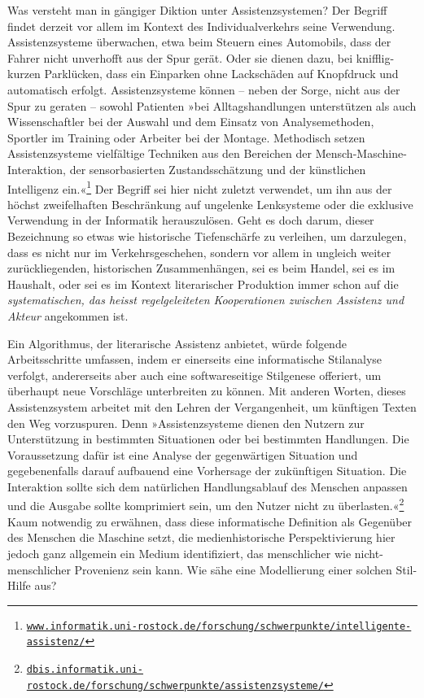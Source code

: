 \documentclass[a4paper,10pt]{article}
\newcommand{\anf}[1]{»#1«}
\begin{document}
Was versteht man in gängiger Diktion unter Assistenzsystemen? Der Begriff findet derzeit vor allem im Kontext des Individualverkehrs seine Verwendung. Assistenzsysteme überwachen, etwa beim Steuern eines Automobils, dass der Fahrer nicht unverhofft aus der Spur gerät. Oder sie dienen dazu, bei knifflig-kurzen Parklücken, dass ein Einparken ohne Lackschäden auf Knopfdruck und automatisch erfolgt. Assistenzsysteme können – neben der Sorge, nicht aus der Spur zu geraten – sowohl Patienten \anf{bei Alltagshandlungen unterstützen als auch Wissenschaftler bei der Auswahl und dem Einsatz von Analysemethoden, Sportler im Training oder Arbeiter bei der Montage. Methodisch setzen Assistenzsysteme vielfältige Techniken aus den Bereichen der Mensch-Maschine-Interaktion, der sensorbasierten Zustandsschätzung und der künstlichen Intelligenz ein.}\footnote{\href{https://www.informatik.uni-rostock.de/forschung/schwerpunkte/intelligente-assistenz/}{\texttt{www.informatik.uni-rostock.de/forschung/schwerpunkte/intelligente-assistenz/}}} Der Begriff sei hier nicht zuletzt verwendet, um ihn aus der höchst zweifelhaften Beschränkung auf ungelenke Lenksysteme oder die exklusive Verwendung in der Informatik herauszulösen. Geht es doch darum, dieser Bezeichnung so etwas wie historische Tiefenschärfe zu verleihen, um darzulegen, dass es nicht nur im Verkehrsgeschehen, sondern vor allem in ungleich weiter zurückliegenden, historischen Zusammenhängen, sei es beim Handel, sei es im Haushalt, oder sei es im Kontext literarischer Produktion immer schon auf die \emph{systematischen, das heisst regelgeleiteten Kooperationen zwischen Assistenz und Akteur} angekommen ist. 

Ein Algorithmus, der literarische Assistenz anbietet, würde folgende Arbeitsschritte umfassen, indem er einerseits eine informatische Stilanalyse verfolgt, andererseits aber auch eine softwareseitige Stilgenese offeriert, um überhaupt neue Vorschläge unterbreiten zu können. Mit anderen Worten, dieses Assistenzsystem arbeitet mit den Lehren der Vergangenheit, um künftigen Texten den Weg vorzuspuren. Denn \anf{Assistenzsysteme dienen den Nutzern zur Unterstützung in bestimmten Situationen oder bei bestimmten Handlungen. Die Voraussetzung dafür ist eine Analyse der gegenwärtigen Situation und gegebenenfalls darauf aufbauend eine Vorhersage der zukünftigen Situation. Die Interaktion sollte sich dem natürlichen Handlungsablauf des Menschen anpassen und die Ausgabe sollte komprimiert sein, um den Nutzer nicht zu überlasten.}\footnote{\href{https://dbis.informatik.uni-rostock.de/forschung/schwerpunkte/assistenzsysteme/}{\texttt{dbis.informatik.uni-rostock.de/forschung/schwerpunkte/assistenzsysteme/}}} Kaum notwendig zu erwähnen, dass diese informatische Definition als Gegenüber des Menschen die Maschine setzt, die medienhistorische Perspektivierung hier jedoch ganz allgemein ein Medium identifiziert, das menschlicher wie nicht-menschlicher Provenienz sein kann. Wie sähe eine Modellierung einer solchen Stil-Hilfe aus?
\end{document}
